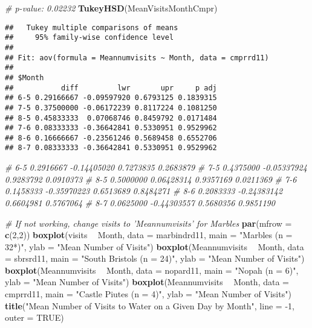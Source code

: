 \documentclass[]{article}
\newenvironment{Shaded}{\begin{snugshade}}{\end{snugshade}}
\newcommand{\CommentTok}[1]{\textcolor[rgb]{0.56,0.35,0.01}{\textit{#1}}}
\newcommand{\DataTypeTok}[1]{\textcolor[rgb]{0.13,0.29,0.53}{#1}}
\newcommand{\DecValTok}[1]{\textcolor[rgb]{0.00,0.00,0.81}{#1}}
\newcommand{\KeywordTok}[1]{\textcolor[rgb]{0.13,0.29,0.53}{\textbf{#1}}}
\newcommand{\NormalTok}[1]{#1}
\newcommand{\OperatorTok}[1]{\textcolor[rgb]{0.81,0.36,0.00}{\textbf{#1}}}
\newcommand{\OtherTok}[1]{\textcolor[rgb]{0.56,0.35,0.01}{#1}}
\newcommand{\StringTok}[1]{\textcolor[rgb]{0.31,0.60,0.02}{#1}}
\begin{document}
\begin{Shaded}
\begin{Highlighting}[]
\CommentTok{# p-value: 0.02232}
\KeywordTok{TukeyHSD}\NormalTok{(MeanVisitsMonthCmpr)}
\end{Highlighting}
\end{Shaded}

\begin{verbatim}
##   Tukey multiple comparisons of means
##     95% family-wise confidence level
## 
## Fit: aov(formula = Meannumvisits ~ Month, data = cmprrd11)
## 
## $Month
##           diff         lwr       upr     p adj
## 6-5 0.29166667 -0.09597920 0.6793125 0.1839315
## 7-5 0.37500000 -0.06172239 0.8117224 0.1081250
## 8-5 0.45833333  0.07068746 0.8459792 0.0171484
## 7-6 0.08333333 -0.36642841 0.5330951 0.9529962
## 8-6 0.16666667 -0.23561246 0.5689458 0.6552706
## 8-7 0.08333333 -0.36642841 0.5330951 0.9529962
\end{verbatim}

\begin{Shaded}
\begin{Highlighting}[]
\CommentTok{# 6-5 0.2916667 -0.14405020 0.7273835 0.2683879}
\CommentTok{# 7-5 0.4375000 -0.05337924 0.9283792 0.0910373}
\CommentTok{# 8-5 0.5000000  0.06428314 0.9357169 0.0211369}
\CommentTok{# 7-6 0.1458333 -0.35970223 0.6513689 0.8484271}
\CommentTok{# 8-6 0.2083333 -0.24383142 0.6604981 0.5767064}
\CommentTok{# 8-7 0.0625000 -0.44303557 0.5680356 0.9851190}

\CommentTok{# If not working, change visits to 'Meannumvisits' for Marbles}
\KeywordTok{par}\NormalTok{(}\DataTypeTok{mfrow =} \KeywordTok{c}\NormalTok{(}\DecValTok{2}\NormalTok{,}\DecValTok{2}\NormalTok{))}
\KeywordTok{boxplot}\NormalTok{(visits }\OperatorTok{~}\StringTok{ }\NormalTok{Month, }\DataTypeTok{data =}\NormalTok{ marbindrd11, }\DataTypeTok{main =} \StringTok{"Marbles (n = 32*)"}\NormalTok{, }\DataTypeTok{ylab =} \StringTok{"Mean Number of Visits"}\NormalTok{)}
\KeywordTok{boxplot}\NormalTok{(Meannumvisits }\OperatorTok{~}\StringTok{ }\NormalTok{Month, }\DataTypeTok{data =}\NormalTok{ sbrsrd11, }\DataTypeTok{main =} \StringTok{"South Bristols (n = 24)"}\NormalTok{, }\DataTypeTok{ylab =} \StringTok{"Mean Number of Visits"}\NormalTok{)}
\KeywordTok{boxplot}\NormalTok{(Meannumvisits }\OperatorTok{~}\StringTok{ }\NormalTok{Month, }\DataTypeTok{data =}\NormalTok{ nopard11, }\DataTypeTok{main =} \StringTok{"Nopah (n = 6)"}\NormalTok{, }\DataTypeTok{ylab =} \StringTok{"Mean Number of Visits"}\NormalTok{)}
\KeywordTok{boxplot}\NormalTok{(Meannumvisits }\OperatorTok{~}\StringTok{ }\NormalTok{Month, }\DataTypeTok{data =}\NormalTok{ cmprrd11, }\DataTypeTok{main =} \StringTok{"Castle Piutes (n = 4)"}\NormalTok{, }\DataTypeTok{ylab =} \StringTok{"Mean Number of Visits"}\NormalTok{)}
\KeywordTok{title}\NormalTok{(}\StringTok{"Mean Number of Visits to Water on a Given Day by Month"}\NormalTok{, }\DataTypeTok{line =} \DecValTok{-1}\NormalTok{, }\DataTypeTok{outer =} \OtherTok{TRUE}\NormalTok{)}
\end{Highlighting}
\end{Shaded}
\end{document}
